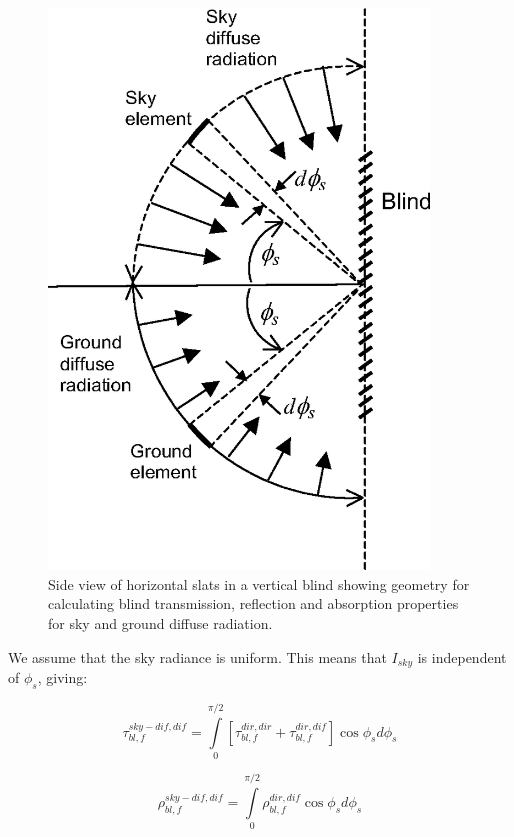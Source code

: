 \begin{figure}[hbtp] %
\centering
\includegraphics[width=0.9\textwidth, height=0.9\textheight, keepaspectratio=true]{media/image1090.png}
\caption{Side view of horizontal slats in a vertical blind showing geometry for calculating blind transmission, reflection and absorption properties for sky and ground diffuse radiation. \protect \label{fig:side-view-of-horizontal-slats-in-a-vertical}}
\end{figure}

We assume that the sky radiance is uniform. This means that \({I_{sky}}\) is independent of \({\phi_s}\), giving:

\begin{equation}
\tau_{bl,f}^{sky - dif,dif} = \int\limits_0^{\pi /2} {\left[ {\tau_{bl,f}^{dir,dir} + \tau_{bl,f}^{dir,dif}} \right]\cos {\phi_s}d{\phi_s}}
\end{equation}

\begin{equation}
\rho_{bl,f}^{sky - dif,dif} = \int\limits_0^{\pi /2} {\rho_{bl,f}^{dir,dif}\cos {\phi_s}d{\phi_s}}
\end{equation}

